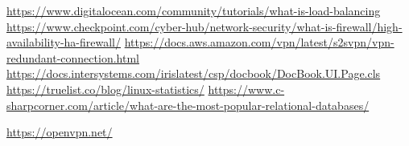 \begin{thebibliography}{9}
     \url{https://www.digitalocean.com/community/tutorials/what-is-load-balancing}
     \url{https://www.checkpoint.com/cyber-hub/network-security/what-is-firewall/high-availability-ha-firewall/}
     \url{https://docs.aws.amazon.com/vpn/latest/s2svpn/vpn-redundant-connection.html}
     \url{https://docs.intersystems.com/irislatest/csp/docbook/DocBook.UI.Page.cls}
     \url{https://truelist.co/blog/linux-statistics/}
     \url{https://www.c-sharpcorner.com/article/what-are-the-most-popular-relational-databases/}
    
     \url{https://openvpn.net/}
\end{thebibliography}